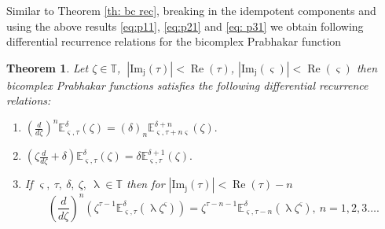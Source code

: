 \documentclass[a4paper,12pt]{article}
\newtheorem{theorem}{Theorem}[section]
\theoremstyle{remark}
\begin{document}
\noindent Similar to Theorem  \ref{th: bc rec}, breaking in the idempotent components and using the  above results  \eqref{eq:p11}, \eqref{eq:p21} and \eqref{eq: p31} we obtain following differential recurrence relations for the bicomplex Prabhakar function 
 

\begin{theorem}
	Let $\zeta \in\mathbb{T}$, $~|\operatorname{Im_j}(\tau)|<\operatorname{Re}(\tau)$, $|\operatorname{Im_j}( \varsigma)|<\operatorname{Re}( \varsigma)$ then bicomplex Prabhakar functions satisfies the following  differential recurrence relations:
	\begin{enumerate}[label=(\roman*)]
		\item 
		$\left( \frac{d}{d\zeta}\right)^n\mathbb{E}^{\delta}_{ \varsigma,\tau}(\zeta)= (\delta)_n \mathbb{E}^{\delta+n}_{ \varsigma,\tau+n \varsigma}(\zeta).$ 
		\item 
		$\left( \zeta\frac{d}{d\zeta}+\delta\right)\mathbb{E}^{\delta}_{ \varsigma,\tau}(\zeta)= \delta \mathbb{E}^{\delta+1}_{ \varsigma,\tau}(\zeta). $
\item If $ \varsigma,~\tau,~\delta,~\zeta,~\uplambda \in\mathbb{T}$ then for $|\operatorname{Im_j}(\tau)|<\operatorname{Re}(\tau)-n$
\begin{equation}
\left( \frac{d}{d\zeta}\right)^n\left( \zeta^{\tau-1}\mathbb{E}^\delta_{ \varsigma,\tau} (\uplambda \zeta^ \varsigma) \right) =\zeta^{\tau-n-1}\mathbb{E}^\delta_{ \varsigma,\tau-n}(\uplambda \zeta^ \varsigma),~n=1,2,3\dots.
\end{equation}
	\end{enumerate}
    
\end{theorem}
	
\end{document}
